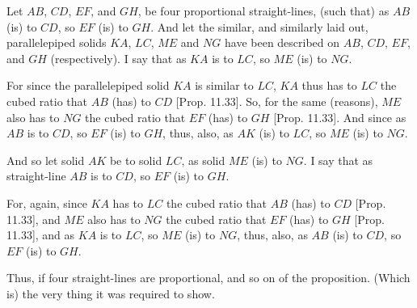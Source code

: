 \begin{Parallel}{}{}
{\epsfysize=1.9in
\centerline{}

Let $AB$, $CD$, $EF$, and $GH$, be four proportional
straight-lines, (such that) as $AB$ (is) to $CD$, so $EF$ (is) to $GH$. 
And let the similar, and similarly laid out, parallelepiped solids $KA$,
$LC$, $ME$ and $NG$ have been described on $AB$, $CD$,
$EF$, and $GH$ (respectively). I say that as $KA$ is to $LC$, so
$ME$ (is) to $NG$.

For since the parallelepiped solid $KA$ is similar to $LC$, $KA$
thus has to $LC$ the cubed ratio that $AB$ (has) to $CD$ [Prop. 11.33]. So, for the same (reasons), $ME$ also has to
$NG$ the cubed ratio that $EF$ (has) to $GH$ [Prop. 11.33]. And since as $AB$
is to $CD$, so $EF$ (is) to $GH$, thus, also,  as $AK$ (is) to
$LC$, so $ME$ (is) to $NG$.

And so let solid $AK$ be to solid $LC$, as solid $ME$ (is) to $NG$.
I say that as straight-line $AB$ is to $CD$, so $EF$ (is) to $GH$.

For, again, since $KA$ has to $LC$ the cubed ratio that
$AB$ (has) to $CD$ [Prop. 11.33], and $ME$ also has to $NG$ the cubed ratio
that $EF$ (has) to $GH$ [Prop. 11.33], and as $KA$ is to $LC$, so $ME$
(is) to $NG$, thus, also, as $AB$ (is) to $CD$, so $EF$ (is) to $GH$.

Thus, if four straight-lines are proportional, and so on of
the proposition. (Which is) the very thing it was required to show.}
\end{Parallel}




